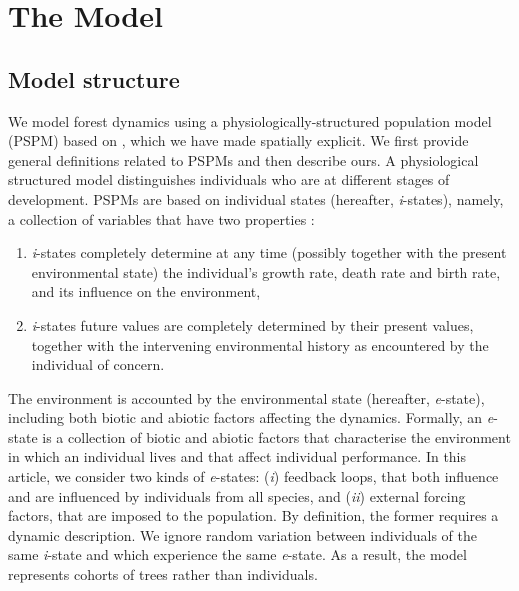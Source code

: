 

\section{The Model}
\subsection{Model structure}
We model forest dynamics using a physiologically-structured population model (PSPM) based on \citet{Strigul2008}, which we have made spatially explicit. We first provide general definitions related to PSPMs and then describe ours. A physiological structured model distinguishes individuals who are at different stages of development. PSPMs are based on individual states (hereafter, \textit{i}-states), namely, a collection of variables that have two properties \citep[for a good overview of PSPMs]{DeRoos1997}:
\begin{enumerate}[label=(\roman*)]
	\item \textit{i}-states completely determine at any time (possibly together with the present environmental state) the individual's growth rate, death rate and birth rate, and its influence on the environment,
	\item \textit{i}-states future values are completely determined by their present values, together with the intervening environmental history as encountered by the individual of concern.
\end{enumerate}
The environment is accounted by the environmental state (hereafter, \textit{e}-state), including both biotic and abiotic factors affecting the dynamics. Formally, an \textit{e}-state is a collection of biotic and abiotic factors that characterise the environment in which an individual lives and that affect individual performance. In this article, we consider two kinds of \textit{e}-states: (\textit{i}) feedback loops, that both influence and are influenced by individuals from all species, and (\textit{ii}) external forcing factors, that are imposed to the population. By definition, the former requires a dynamic description. We ignore random variation between individuals of the same \textit{i}-state and which experience the same \textit{e}-state. As a result, the model represents cohorts of trees rather than individuals.

